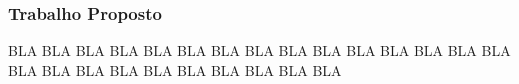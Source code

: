 \begin{frame}
\frametitle{Trabalho Proposto}
BLA BLA BLA BLA BLA
BLA BLA BLA BLA BLA
BLA BLA BLA BLA BLA
BLA BLA BLA BLA BLA
BLA BLA BLA BLA BLA
\end{frame}
 